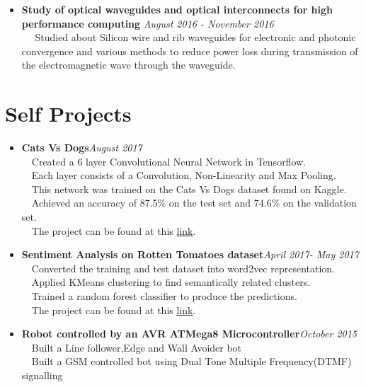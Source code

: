 \documentclass[margin, centered]{res}
\begin{document}
\begin{resume}
\begin{itemize}
\item \textbf{Study of optical waveguides and optical interconnects for high performance computing} \hfill\textit{August 2016 - November 2016}\\
~\textbullet~ Studied about Silicon wire and rib waveguides for electronic and photonic convergence and various methods to reduce power loss during transmission of the electromagnetic wave through the waveguide.\\
\end{itemize}

\section{\textbf{Self Projects}}
\begin{itemize}
\item \textbf{Cats Vs Dogs}\hfill\textit{August 2017}\\
~\textbullet~Created a 6 layer Convolutional Neural Network in Tensorflow.\\
~\textbullet~Each layer consists of a Convolution, Non-Linearity and Max Pooling.\\
~\textbullet~This network was trained on the Cats Vs Dogs dataset found on Kaggle.\\
~\textbullet~Achieved an accuracy of 87.5\% on the test set and 74.6\% on the validation set.\\
~\textbullet~The project can be found at this \href{https://github.com/harshanavkis/Dogs-Vs-Cats}{link}.\\
\end{itemize}

\begin{itemize}
\item \textbf{Sentiment Analysis on Rotten Tomatoes dataset}\hfill\textit{April 2017- May 2017}\\
~\textbullet~Converted the training and test dataset into word2vec representation.\\
~\textbullet~Applied KMeans clustering to find semantically related clusters.\\
~\textbullet~Trained a random forest classifier to produce the predictions.\\
~\textbullet~The project can be found at this \href{https://github.com/harshanavkis/Kaggle-Rotten-Tomatoes-Competition}{link}.\\
\end{itemize}

\begin{itemize}
\item \textbf{Robot controlled by an AVR ATMega8 Microcontroller}\hfill\textit{October 2015}\\
~\textbullet~Built a Line follower,Edge and Wall Avoider bot\\
~\textbullet~Built a GSM controlled bot using Dual Tone Multiple Frequency(DTMF) signalling
\end{itemize}


\end{resume}
\end{document}

